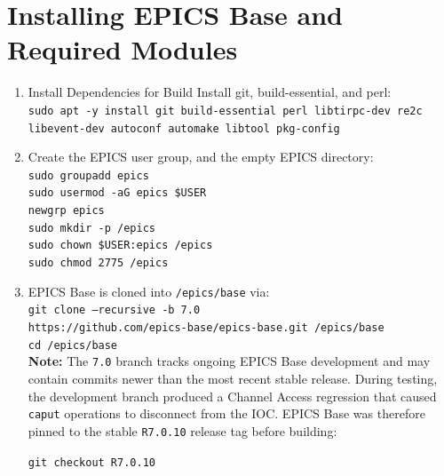 \section{Installing EPICS Base and Required Modules}
	\begin{enumerate}
		\item Install Dependencies for Build
			\hspace*{2em} Install git, build-essential, and perl:\\ \texttt{sudo apt -y install git build-essential perl libtirpc-dev re2c libevent-dev autoconf automake libtool pkg-config}
		\item Create the EPICS user group, and the empty EPICS directory: \\
			\hspace*{2em} \texttt{sudo groupadd epics}\\
			\hspace*{2em} \texttt{sudo usermod -aG epics \$USER}\\
			\hspace*{2em} \texttt{newgrp epics}\\
			\hspace*{2em} \texttt{sudo mkdir -p /epics}\\
			\hspace*{2em} \texttt{sudo chown \$USER:epics /epics}\\
			\hspace*{2em} \texttt{sudo chmod 2775 /epics}\\
		\item EPICS Base is cloned into \texttt{/epics/base} via:\\
			\hspace*{2em} \texttt{git clone --recursive -b 7.0} \\ \hspace*{4em}\texttt{https://github.com/epics-base/epics-base.git /epics/base}\\
			\hspace*{2em} \texttt{cd /epics/base}\\

            \textbf{Note:} The \texttt{7.0} branch tracks ongoing EPICS Base development and may contain commits newer than the most recent stable release. During testing, the development branch produced a Channel Access regression that caused \texttt{caput} operations to disconnect from the IOC. EPICS Base was therefore pinned to the stable \texttt{R7.0.10} release tag before building:

            \hspace*{2em} \texttt{git checkout R7.0.10}


\end{enumerate}

